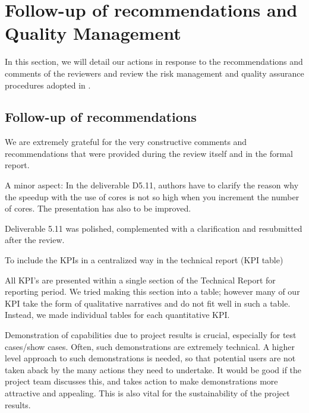 \section{Follow-up of recommendations and Quality Management}

In this section, we will detail our actions in response to the recommendations and
comments of the reviewers and review the risk management and quality assurance procedures
adopted in \pn.

\subsection{Follow-up of recommendations}

We are extremely grateful for the very constructive comments and
recommendations that were provided during the review itself and in the
formal report.

\begin{recommendation}
  A minor aspect: In the deliverable D5.11, authors have to clarify
  the reason why the speedup with the use of cores is not so high when
  you increment the number of cores. The presentation has also to be
  improved.
\end{recommendation}

Deliverable 5.11 was polished, complemented with a clarification and
resubmitted after the review.

\begin{recommendation}
  To include the KPIs in a centralized way in the technical report (KPI table)
\end{recommendation}

All KPI's are presented within a single section of the Technical
Report for reporting period. We tried making this section into a
table; however many of our KPI take the form of qualitative narratives
and do not fit well in such a table. Instead, we made individual
tables for each quantitative KPI.

\begin{recommendation}
  Demonstration of capabilities due to project results is crucial,
  especially for test cases/show cases. Often, such demonstrations are
  extremely technical. A higher level approach to such demonstrations
  is needed, so that potential users are not taken aback by the many
  actions they need to undertake. It would be good if the project team
  discusses this, and takes action to make demonstrations more
  attractive and appealing. This is also vital for the sustainability
  of the project results.
\end{recommendation}

